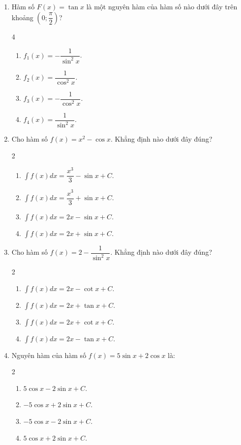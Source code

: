 \documentclass[12pt]{article}
\begin{document}
\begin{enumerate}[label=\textbf{Câu \arabic*.}]
		\item Hàm số $F(x) = \tan x$ là một nguyên hàm của hàm số nào dưới đây trên khoảng $\left( 0; \dfrac{\pi}{2} \right)$?
		\begin{multicols}{4}
			\begin{enumerate}[label=\textbf{\Alph*.}]
				\item $f_1(x) = -\dfrac{1}{\sin^2 x}$.
				\item $f_2(x) = \dfrac{1}{\cos^2 x}$.
				\item $f_3(x) = -\dfrac{1}{\cos^2 x}$.
				\item $f_4(x) = \dfrac{1}{\sin^2 x}$.
			\end{enumerate}
		\end{multicols}
		
		\item Cho hàm số $f(x) = x^2 - \cos x$. Khẳng định nào dưới đây đúng?
		\begin{multicols}{2}
			\begin{enumerate}[label=\textbf{\Alph*.}]
				\item $\displaystyle \int f(x)dx = \dfrac{x^3}{3} - \sin x + C$.
				\item $\displaystyle \int f(x)dx = \dfrac{x^3}{3} + \sin x + C$.
				\item $\displaystyle \int f(x)dx = 2x - \sin x + C$.
				\item $\displaystyle \int f(x)dx = 2x + \sin x + C$.
			\end{enumerate}
		\end{multicols}
		
		\item Cho hàm số $f(x) = 2 - \dfrac{1}{\sin^2 x}$. Khẳng định nào dưới đây đúng?
		\begin{multicols}{2}
			\begin{enumerate}[label=\textbf{\Alph*.}]
				\item $\displaystyle \int f(x)dx = 2x - \cot x + C$.
				\item $\displaystyle \int f(x)dx = 2x + \tan x + C$.
				\item $\displaystyle \int f(x)dx = 2x + \cot x + C$.
				\item $\displaystyle \int f(x)dx = 2x - \tan x + C$.
			\end{enumerate}
		\end{multicols}
		
		\item Nguyên hàm của hàm số $f(x) = 5\sin x + 2\cos x$ là:
		\begin{multicols}{2}
			\begin{enumerate}[label=\textbf{\Alph*.}]
				\item $5\cos x - 2\sin x + C$.
				\item $-5\cos x + 2\sin x + C$.
				\item $-5\cos x - 2\sin x + C$.
				\item $5\cos x + 2\sin x + C$.
			\end{enumerate}
		\end{multicols}
		

\end{enumerate}
\end{document}
